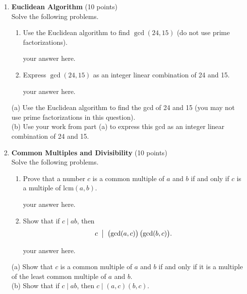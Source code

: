 \begin{enumerate}
  


















\newpage 
\section{Exam1}

  \item \textbf{Euclidean Algorithm} (10 points)\\
  Solve the following problems.
  \begin{enumerate}[label=(\alph*)]
    \item Use the Euclidean algorithm to find \(\gcd(24,15)\) (do not use prime factorizations).
    \begin{subanswer}
      your answer here.
    \end{subanswer}
    \item Express \(\gcd(24,15)\) as an integer linear combination of 24 and 15.
    \begin{subanswer}
      your answer here.
    \end{subanswer}
  \end{enumerate}
  (a) Use the Euclidean algorithm to find the gcd of 24 and 15 (you may not use prime factorizations in this question).\\
(b) Use your work from part (a) to express this gcd as an integer linear combination of 24 and 15.


  \item \textbf{Common Multiples and Divisibility} (10 points)\\
  Solve the following problems.
  \begin{enumerate}[label=(\alph*)]
    \item Prove that a number \(c\) is a common multiple of \(a\) and \(b\) 
    if and only if \(c\) is a multiple of \(\mathrm{lcm}(a,b)\).
    \begin{subanswer}
      your answer here.
    \end{subanswer}
    \item Show that if \(c\mid ab\), then
    \[
    c \;\bigm|\; \bigl(\gcd(a,c)\bigr)\,\bigl(\gcd(b,c)\bigr).
    \]
    \begin{subanswer}
      your answer here.
    \end{subanswer}
  \end{enumerate}
  (a) Show that $c$ is a common multiple of $a$ and $b$ if and only if it is a multiple of the least common multiple of $a$ and $b$.\\
(b) Show that if $c \mid a b$, then $c \mid (a, c)(b, c)$.



\end{enumerate}
